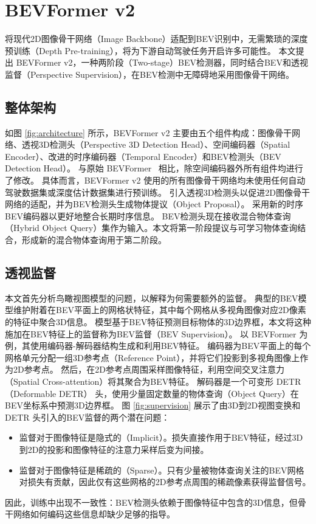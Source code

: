 \section{BEVFormer v2}
将现代2D图像骨干网络（Image Backbone）适配到BEV识别中，无需繁琐的深度预训练（Depth Pre-training），将为下游自动驾驶任务开启许多可能性。
本文提出 BEVFormer v2，一种两阶段（Two-stage）BEV检测器，同时结合BEV和透视监督（Perspective Supervision），在BEV检测中无障碍地采用图像骨干网络。

\subsection{整体架构}
如图 \ref{fig:architecture} 所示，BEVFormer v2 主要由五个组件构成：图像骨干网络、透视3D检测头（Perspective 3D Detection Head）、空间编码器（Spatial Encoder）、改进的时序编码器（Temporal Encoder）和BEV检测头（BEV Detection Head）。
与原始 BEVFormer~\cite{bevformer} 相比，除空间编码器外所有组件均进行了修改。
具体而言，BEVFormer v2 使用的所有图像骨干网络均未使用任何自动驾驶数据集或深度估计数据集进行预训练。
引入透视3D检测头以促进2D图像骨干网络的适配，并为BEV检测头生成物体提议（Object Proposal）。
采用新的时序BEV编码器以更好地整合长期时序信息。
BEV检测头现在接收混合物体查询（Hybrid Object Query）集作为输入。本文将第一阶段提议与可学习物体查询结合，形成新的混合物体查询用于第二阶段。

\subsection{透视监督}
本文首先分析鸟瞰视图模型的问题，以解释为何需要额外的监督。
典型的BEV模型维护附着在BEV平面上的网格状特征，其中每个网格从多视角图像对应2D像素的特征中聚合3D信息。
模型基于BEV特征预测目标物体的3D边界框，本文将这种施加在BEV特征上的监督称为BEV监督（BEV Supervision）。
以 BEVFormer \cite{bevformer} 为例，其使用编码器-解码器结构生成和利用BEV特征。
编码器为BEV平面上的每个网格单元分配一组3D参考点（Reference Point），并将它们投影到多视角图像上作为2D参考点。
然后，在2D参考点周围采样图像特征，利用空间交叉注意力（Spatial Cross-attention）将其聚合为BEV特征。
解码器是一个可变形 DETR（Deformable DETR）\cite{deformable-detr} 头，使用少量固定数量的物体查询（Object Query）在BEV坐标系中预测3D边界框。
图 \ref{fig:supervision} 展示了由3D到2D视图变换和 DETR \cite{DETR} 头引入的BEV监督的两个潜在问题：
\begin{itemize}
    \item 监督对于图像特征是隐式的（Implicit）。损失直接作用于BEV特征，经过3D到2D的投影和图像特征的注意力采样后变为间接。
    \item 监督对于图像特征是稀疏的（Sparse）。只有少量被物体查询关注的BEV网格对损失有贡献，因此仅有这些网格的2D参考点周围的稀疏像素获得监督信号。
\end{itemize}
因此，训练中出现不一致性：BEV检测头依赖于图像特征中包含的3D信息，但骨干网络如何编码这些信息却缺少足够的指导。

